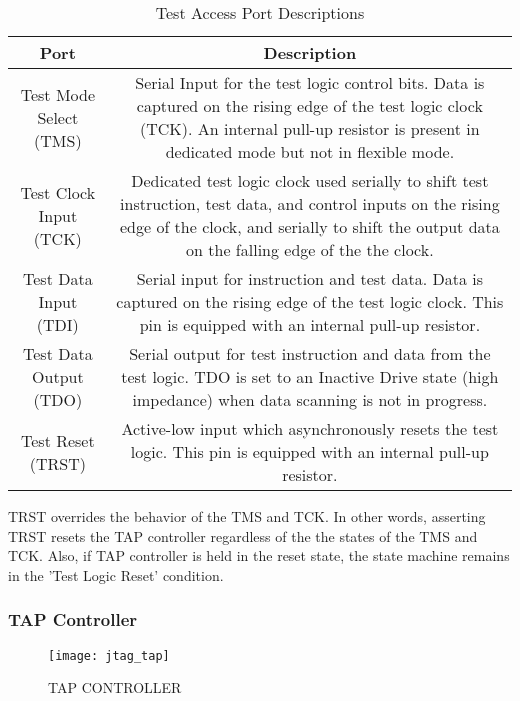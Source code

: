 \documentclass[a4paper,11pt]{article}
\begin{document}
\begin{center}
\begin{table}[!h]
\caption{Test Access Port Descriptions}
\label{table:tap}
\begin{tabular}{|c|c|}
 \hline
 \textbf{Port} & \textbf{Description} \\ \hline
 Test Mode Select (TMS) & \multicolumn{1}{m{11cm}|}{Serial Input  for the test logic control bits. Data is captured on the rising edge of the test logic clock (TCK). An internal pull-up resistor is present in dedicated mode but not in flexible mode. }\\\hline
 Test Clock Input (TCK) & \multicolumn{1}{m{11cm}|}{Dedicated test logic clock used serially to shift test instruction, test data, and control inputs on the rising edge of the clock, and serially to shift the output data on the falling edge of the the clock.}\\\hline
Test Data Input (TDI) & \multicolumn{1}{m{11cm}|}{Serial input for instruction and test data. Data is captured on the rising edge of the test logic clock. This pin is equipped with an internal pull-up resistor.}\\\hline
Test Data Output (TDO) & \multicolumn{1}{m{11cm}|}{Serial output for test instruction and data from the test logic. TDO is set to an Inactive Drive state (high impedance) when data scanning is not in progress.}\\\hline
Test Reset (TRST) & \multicolumn{1}{m{11cm}|}{Active-low input which asynchronously resets the test logic. This pin is equipped with an internal pull-up resistor.}\\\hline
\end{tabular}
\end{table}
\end{center}

\FloatBarrier
TRST overrides the behavior of the TMS and TCK. In other words, asserting TRST resets the TAP controller regardless of the the states of the TMS and TCK. Also, if TAP controller is held in the reset state, the state machine remains in the 'Test Logic Reset' condition.

\subsubsection{TAP Controller}

\begin{figure}[ht]
\centering
\texttt{[image: jtag\_tap]}
\label{fig:jtag_tap}
\caption{TAP CONTROLLER \cite{fpga4fun}}
\end{figure}
\end{document}
